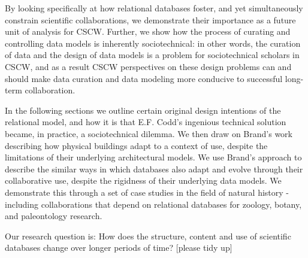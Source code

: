 By looking specifically at how relational databases foster, and yet simultaneously constrain scientific collaborations, we demonstrate their importance as a future unit of analysis for CSCW. Further, we show how the process of curating and controlling data models is inherently sociotechnical: in other words, the curation of data and the design of data models is a problem for sociotechnical scholars in CSCW, and as a result CSCW perspectives on these design problems can and should make data curation and data modeling more conducive to successful long-term collaboration. 

In the following sections we outline certain original design intentions of the relational model, and how it is that E.F. Codd's ingenious technical solution became, in practice, a sociotechnical dilemma. We then draw on Brand's work describing how physical buildings adapt to a context of use, despite the limitations of their underlying architectural models. We use Brand's approach to describe the similar ways in which databases also adapt and evolve through their collaborative use, despite the rigidness of their underlying data models. We demonstrate this through a set of case studies in the field of natural history - including collaborations that depend on relational databases for zoology, botany, and paleontology research.  

Our research question is: How does the structure, content and use of scientific databases change over longer periods of time? [please tidy up]
